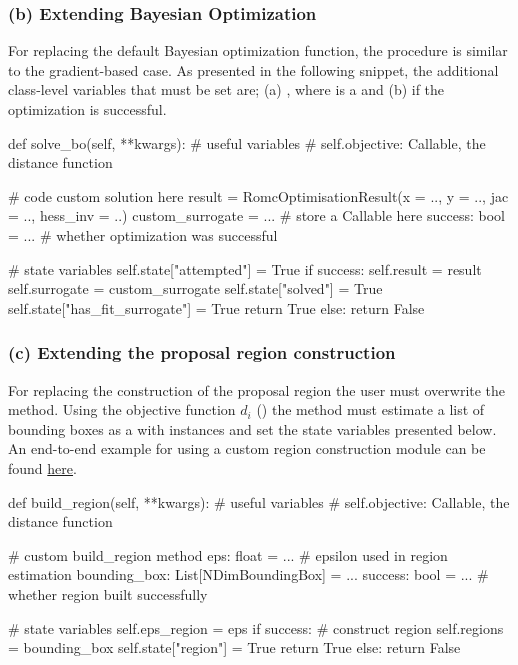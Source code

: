 \documentclass[article, shortnames]{jss}
\begin{document}
\subsubsection*{(b) Extending Bayesian Optimization}

For replacing the default Bayesian optimization function, the
procedure is similar to the gradient-based case. As presented in the
following snippet, the additional class-level variables that must be
set are; (a) , where
 is a  and (b)
 if the optimization is
successful.

\begin{Code}
def solve_bo(self, **kwargs):
    # useful variables
    # self.objective: Callable, the distance function

    # code custom solution here
    result = RomcOptimisationResult(x = .., y = .., jac = .., hess_inv = ..)
    custom_surrogate = ... # store a Callable here
    success: bool = ... # whether optimization was successful

    # state variables
    self.state["attempted"] = True
    if success:
        self.result = result
        self.surrogate = custom_surrogate
        self.state["solved"] = True
        self.state["has_fit_surrogate"] = True
        return True
    else:
        return False
\end{Code}

\subsubsection*{(c) Extending the proposal region construction}

For replacing the construction of the proposal region the user must
overwrite the  method. Using the objective function
\(d_i\) () the method must estimate a list of
bounding boxes as a  with  instances
and set the state variables presented below. An end-to-end example for
using a custom region construction module can be found
\href{https://colab.research.google.com/drive/1RzB-V1QueP1y1nyzv_VOqR1nVz3DUH3v?usp=sharing}{here}.

\begin{Code}
def build_region(self, **kwargs):
    # useful variables
    # self.objective: Callable, the distance function

    # custom build_region method
    eps: float = ... # epsilon used in region estimation
    bounding_box: List[NDimBoundingBox] = ...
    success: bool = ... # whether region built successfully

    # state variables
    self.eps_region = eps
    if success:
        # construct region
        self.regions = bounding_box
        self.state["region"] = True
        return True
    else:
        return False
\end{Code}
\end{document}
